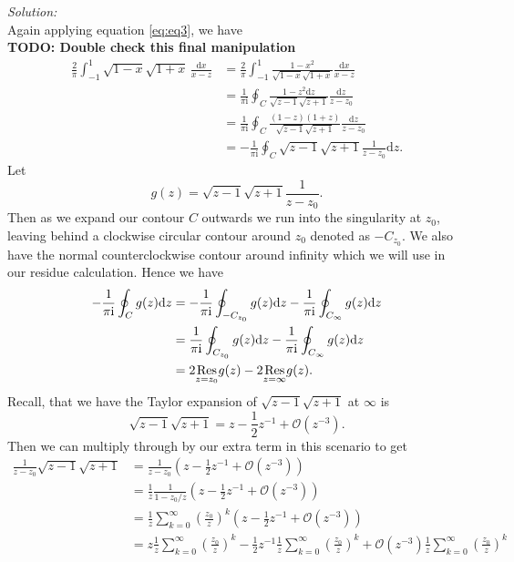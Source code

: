 \documentclass[10pt]{amsart}
\newcommand{\D}{\mathrm{d}}
\newcommand{\I}{\mathrm{i}}
\theoremstyle{nonumberplain}
\begin{document}
\begin{enumerate}[label={\bf {\arabic*}:}]
\begin{enumerate}
\textit{Solution:} \\
Again applying equation \eqref{eq:eq3}, we have \\
\textbf{TODO: Double check this final manipulation}
\begin{align*}
\frac{2}{\pi} \int_{-1}^1 \sqrt{1 -x} \sqrt{1 + x}\, \frac{\D x}{x -z}
	&= \frac{2}{\pi}  \int_{-1}^1 \frac{1 - x^2}{\sqrt{1 - x} \sqrt{1 + x}} \frac{\D x}{x -z}\\
	&= \frac{1}{\pi \I} \oint_C \frac{1 - z^2\D z}{\sqrt{z -1} \sqrt{z + 1}} \frac{\D z}{z - z_0} \\
	&= \frac{1}{\pi \I} \oint_C \frac{(1 - z)(1 + z) }{\sqrt{z -1} \sqrt{z + 1}} \frac{\D z}{z - z_0} \\
	&= - \frac 1 {\pi \I} \oint_C \sqrt {z - 1} \sqrt {z + 1} \frac 1 {z - z_0} \D z.
\end{align*}
Let
$$g(z) = \sqrt {z - 1} \sqrt {z + 1} \frac 1 {z - z_0}.$$
Then as we expand our contour $C$ outwards we run into the singularity at $z_0$, leaving behind a clockwise circular contour around $z_0$ denoted as $-C_{z_0}$.
We also have the normal counterclockwise contour around infinity which we will use in our residue calculation.
Hence we have
\begin{align}
- \frac 1 {\pi \I} \oint_C g(z) \D z
	&= - \frac 1 {\pi \I} \oint_{-C_{z_0}} g(z) \D z - \frac 1 {\pi \I} \oint_{C_\infty} g(z) \D z \nonumber \\
	&= \frac 1 {\pi \I} \oint_{C_{z_0}} g(z) \D z - \frac 1 {\pi \I} \oint_{C_\infty} g(z) \D z \nonumber \\
	&= 2 \underset{z=z_0}{{\rm Res}} g(z) - 2 \underset{z=\infty}{{\rm Res}} g(z).
\label{eq:eq5}
\end{align}
Recall, that we have the Taylor expansion of $\sqrt {z - 1} \sqrt {z + 1}$ at $\infty$ is
$$
\sqrt {z - 1} \sqrt {z + 1} = z - \frac 1 2 z^{-1} + \mathcal O(z^{-3}).
$$
Then we can multiply through by our extra term in this scenario to get
\begin{align*}
\frac 1 {z - z_0}\sqrt {z - 1} \sqrt {z + 1} &= \frac 1 {z - z_0} \left(z - \frac 1 2 z^{-1} + \mathcal O(z^{-3})\right) \\
	&= \frac 1 z \frac 1 {1 - z_0/z} \left(z - \frac 1 2 z^{-1} + \mathcal O(z^{-3})\right) \\
	&= \frac 1 z \sum_{k = 0}^\infty \left(\frac {z_0} z\right)^k \left(z - \frac 1 2 z^{-1} + \mathcal O(z^{-3})\right) \\
	&=  z\frac 1 z \sum_{k = 0}^\infty \left(\frac {z_0} z\right)^k - \frac 1 2 z^{-1}\frac 1 z \sum_{k = 0}^\infty \left(\frac {z_0} z\right)^k + \mathcal O(z^{-3})\frac 1 z \sum_{k = 0}^\infty \left(\frac {z_0} z\right)^k \\

\end{align*}
\end{enumerate}
\end{enumerate}
\end{document}
